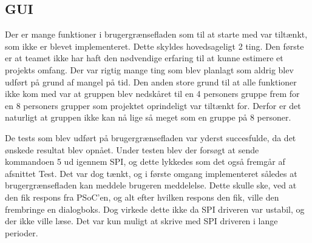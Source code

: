 \subsection{GUI}

Der er mange funktioner i brugergrænsefladen som til at starte med var tiltænkt, som ikke er blevet implementeret. Dette skyldes hovedsageligt 2 ting. Den første er at teamet ikke har haft den nødvendige erfaring til at kunne estimere et projekts omfang. Der var rigtig mange ting som blev planlagt som aldrig blev udført på grund af mangel på tid. Den anden store grund til at alle funktioner ikke kom med var at gruppen blev nedskåret til en 4 personers gruppe frem for en 8 personers grupper som projektet oprindeligt var tiltænkt for. Derfor er det naturligt at gruppen ikke kan nå lige så meget som en gruppe på 8 personer.

De tests som blev udført på brugergrænsefladen var yderst succesfulde, da det ønskede resultat blev opnået. Under testen blev der forsøgt at sende kommandoen 5 ud igennem SPI, og dette lykkedes som det også fremgår af afsnittet Test.  Det var dog tænkt, og i første omgang implementeret således at brugergrænsefladen kan meddele brugeren meddelelse. Dette skulle ske, ved at den fik respons fra PSoC’en, og alt efter hvilken respons den fik, ville den frembringe en dialogboks. Dog virkede dette ikke da SPI driveren var ustabil, og der ikke ville læse. Det var kun muligt at skrive med SPI driveren i lange perioder.
